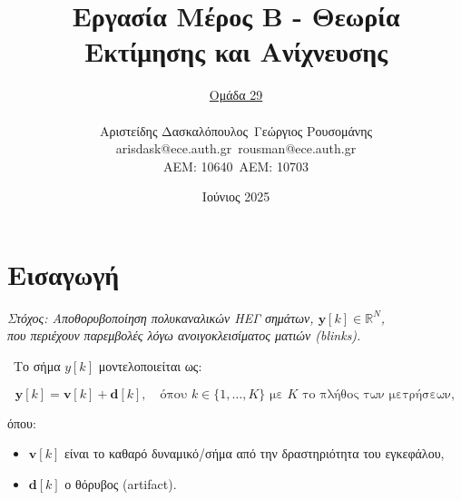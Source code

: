 \documentclass[12pt]{article} %
\title{Εργασία Μέρος Β - Θεωρία Εκτίμησης και Ανίχνευσης}
\author{%
  \underline{Ομάδα 29} \\
  \begin{tabular}{ccc}
  Αριστείδης Δασκαλόπουλος & \  & Γεώργιος Ρουσομάνης \\
  arisdask@ece.auth.gr & \  & rousman@ece.auth.gr \\ 
  ΑΕΜ: 10640 & \  & ΑΕΜ: 10703
  \end{tabular}
}
\date{Ιούνιος 2025}
\begin{document}
\maketitle

\section*{Εισαγωγή}

\begin{center}
    \textit{Στόχος: Αποθορυβοποίηση πολυκαναλικών ΗΕΓ σημάτων, $\mathbf{y}[k] \in \mathbb{R}^N$, \\ που περιέχουν παρεμβολές λόγω ανοιγοκλεισίματος ματιών (blinks).}
\end{center}

\noindent\textrightarrow\ Το σήμα $y[k]$ μοντελοποιείται ως:

\vspace{-8pt}

\[
\mathbf{y}[k] = \mathbf{v}[k] + \mathbf{d}[k], \quad\text{όπου $k \in \{1, \ldots, K\}$ με $K$ το πλήθος των μετρήσεων},
\]

\vspace{-5pt}

όπου: 
\begin{itemize}[noitemsep, nolistsep]
    \item $\mathbf{v}[k]$ είναι το καθαρό δυναμικό/σήμα από την δραστηριότητα του εγκεφάλου,
    \item $\mathbf{d}[k]$ ο θόρυβος (artifact).
\end{itemize}

\vspace{+10pt}
\end{document}
